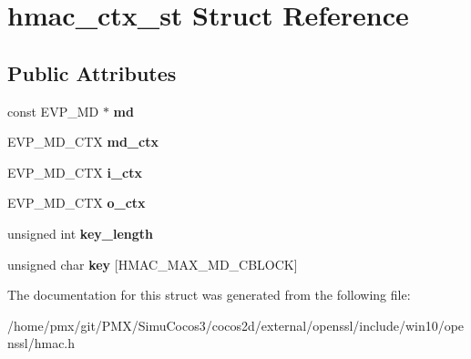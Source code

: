 \hypertarget{structhmac__ctx__st}{}\section{hmac\+\_\+ctx\+\_\+st Struct Reference}
\label{structhmac__ctx__st}
\subsection*{Public Attributes}
\begin{DoxyCompactItemize}
\item 
\mbox{\label{structhmac__ctx__st_a9aaff763ed7d862ad49ffa19073deac5}} 
const E\+V\+P\+\_\+\+MD $\ast$ {\bfseries md}
\item 
\mbox{\label{structhmac__ctx__st_a47d4d66a70519722df931e144dbc77a0}} 
E\+V\+P\+\_\+\+M\+D\+\_\+\+C\+TX {\bfseries md\+\_\+ctx}
\item 
\mbox{\label{structhmac__ctx__st_aa702847295c2c2c40f6093936b89a829}} 
E\+V\+P\+\_\+\+M\+D\+\_\+\+C\+TX {\bfseries i\+\_\+ctx}
\item 
\mbox{\label{structhmac__ctx__st_a9ac033d3f121ddbb6329e68825318ad8}} 
E\+V\+P\+\_\+\+M\+D\+\_\+\+C\+TX {\bfseries o\+\_\+ctx}
\item 
\mbox{\label{structhmac__ctx__st_a7330fd76130fea0171458261bfc11226}} 
unsigned int {\bfseries key\+\_\+length}
\item 
\mbox{\label{structhmac__ctx__st_a67cdff832dfb8cf2bf7affb9634ef82a}} 
unsigned char {\bfseries key} \mbox{[}H\+M\+A\+C\+\_\+\+M\+A\+X\+\_\+\+M\+D\+\_\+\+C\+B\+L\+O\+CK\mbox{]}
\end{DoxyCompactItemize}


The documentation for this struct was generated from the following file\+:\begin{DoxyCompactItemize}
\item 
/home/pmx/git/\+P\+M\+X/\+Simu\+Cocos3/cocos2d/external/openssl/include/win10/openssl/hmac.\+h\end{DoxyCompactItemize}
